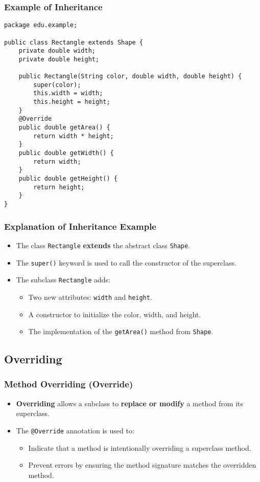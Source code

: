 \documentclass[aspectratio=169, table]{beamer}
\begin{document}
\begin{frame}[fragile]
\frametitle{Example of Inheritance}

\begin{lstlisting}[style=JavaStyle, caption={Example of Inheritance: \texttt{Rectangle.java}}]
package edu.example;

public class Rectangle extends Shape {
	private double width;
	private double height;
	
	public Rectangle(String color, double width, double height) {
		super(color);
		this.width = width;
		this.height = height;
	}
	@Override
	public double getArea() {
		return width * height;
	}
	public double getWidth() {
		return width;
	}
	public double getHeight() {
		return height;
	}
}
\end{lstlisting}
\end{frame}

\begin{frame}[fragile]
	\frametitle{Explanation of Inheritance Example}
	
	\begin{itemize}
		\item The class \texttt{Rectangle} \textbf{extends} the abstract class \texttt{Shape}.
		\item The \texttt{super()} keyword is used to call the constructor of the superclass.
		\item The subclass \texttt{Rectangle} adds:
		\begin{itemize}
			\item Two new attributes: \texttt{width} and \texttt{height}.
			\item A constructor to initialize the color, width, and height.
			\item The implementation of the \texttt{getArea()} method from \texttt{Shape}.
		\end{itemize}
	\end{itemize}
\end{frame}

\subsection{Overriding}
\begin{frame}[fragile]
	\frametitle{Method Overriding (\textbf{Override})}
	
	\begin{itemize}
		\item \textbf{Overriding} allows a subclass to \textbf{replace or modify} a method from its superclass.
		\item The \texttt{@Override} annotation is used to:
		\begin{itemize}
			\item Indicate that a method is intentionally overriding a superclass method.
			\item Prevent errors by ensuring the method signature matches the overridden method.
		\end{itemize}
	\end{itemize}
\end{frame}
\end{document}
